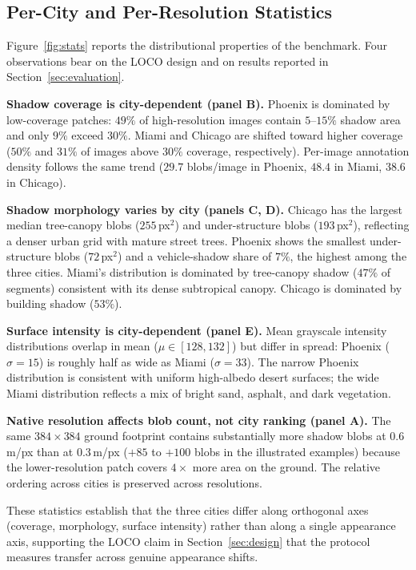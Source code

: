 \subsection{Per-City and Per-Resolution Statistics}
\label{app:perCity}



Figure~\ref{fig:stats} reports the distributional properties of the
benchmark. Four observations bear on the LOCO design and on results
reported in Section~\ref{sec:evaluation}.

\textbf{Shadow coverage is city-dependent (panel B).}
Phoenix is dominated by low-coverage patches: $49\%$ of high-resolution
images contain $5$--$15\%$ shadow area and only $9\%$ exceed $30\%$. Miami
and Chicago are shifted toward higher coverage ($50\%$ and $31\%$ of
images above $30\%$ coverage, respectively). Per-image annotation density
follows the same trend ($29.7$ blobs/image in Phoenix, $48.4$ in Miami,
$38.6$ in Chicago).

\textbf{Shadow morphology varies by city (panels C, D).}
Chicago has the largest median tree-canopy blobs ($255$\,px$^2$) and
under-structure blobs ($193$\,px$^2$), reflecting a denser urban grid with
mature street trees. Phoenix shows the smallest under-structure blobs
($72$\,px$^2$) and a vehicle-shadow share of $7\%$, the highest among the
three cities. Miami's distribution is dominated by tree-canopy shadow
($47\%$ of segments) consistent with its dense subtropical canopy. Chicago
is dominated by building shadow ($53\%$).

\textbf{Surface intensity is city-dependent (panel E).}
Mean grayscale intensity distributions overlap in mean
($\mu\!\in\![128, 132]$) but differ in spread: Phoenix
($\sigma\!=\!15$) is roughly half as wide as Miami ($\sigma\!=\!33$). The
narrow Phoenix distribution is consistent with uniform high-albedo desert
surfaces; the wide Miami distribution reflects a mix of bright sand,
asphalt, and dark vegetation.

\textbf{Native resolution affects blob count, not city ranking (panel A).}
The same $384{\times}384$ ground footprint contains substantially more
shadow blobs at $0.6$\,m/px than at $0.3$\,m/px ($+85$ to $+100$ blobs in
the illustrated examples) because the lower-resolution patch covers
$4{\times}$ more area on the ground. The relative ordering across cities is
preserved across resolutions.

These statistics establish that the three cities differ along orthogonal
axes (coverage, morphology, surface intensity) rather than along a single
appearance axis, supporting the LOCO claim in Section~\ref{sec:design}
that the protocol measures transfer across genuine appearance shifts.

